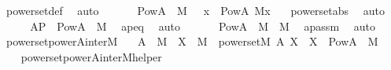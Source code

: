 \begin{isabellebody}
\ powerset{\isacharunderscore}{\kern0pt}def\ \isamarkupfalse%
\ auto\ \isanewline
\ \ \isamarkupfalse%
\ \isamarkupfalse%
\ {\isachardoublequoteopen}Pow{\isacharparenleft}{\kern0pt}A{\isacharparenright}{\kern0pt}\ {\isasyminter}\ M\ {\isacharequal}{\kern0pt}\ {\isacharbraceleft}{\kern0pt}\ x\ {\isasymin}\ Pow{\isacharparenleft}{\kern0pt}A{\isacharparenright}{\kern0pt}{\isachardot}{\kern0pt}\ {\isacharparenleft}{\kern0pt}{\isacharhash}{\kern0pt}{\isacharhash}{\kern0pt}M{\isacharparenright}{\kern0pt}{\isacharparenleft}{\kern0pt}x{\isacharparenright}{\kern0pt}\ {\isacharbraceright}{\kern0pt}{\isachardoublequoteclose}\ \isamarkupfalse%
\ powerset{\isacharunderscore}{\kern0pt}abs\ \isamarkupfalse%
\ auto\ \isanewline
\ \ \isamarkupfalse%
\ \isamarkupfalse%
\ {\isachardoublequoteopen}AP\ {\isacharequal}{\kern0pt}\ Pow{\isacharparenleft}{\kern0pt}A{\isacharparenright}{\kern0pt}\ {\isasyminter}\ M{\isachardoublequoteclose}\ \isamarkupfalse%
\ apeq\ \isamarkupfalse%
\ auto\ \isanewline
\ \ \isamarkupfalse%
\ \isamarkupfalse%
\ {\isachardoublequoteopen}{\isacharparenleft}{\kern0pt}Pow{\isacharparenleft}{\kern0pt}A{\isacharparenright}{\kern0pt}\ {\isasyminter}\ M{\isacharparenright}{\kern0pt}\ {\isasymin}\ M{\isachardoublequoteclose}\ \isamarkupfalse%
\ apassm\ \isamarkupfalse%
\ auto\ \isanewline
{}\isamarkupfalse%
%
\endisatagproof
{\isafoldproof}%
%
\isadelimproof
\isanewline
%
\endisadelimproof
\isanewline
{}\isamarkupfalse%
\ powerset{\isacharunderscore}{\kern0pt}powerA{\isacharunderscore}{\kern0pt}inter{\isacharunderscore}{\kern0pt}M\isanewline
\ \ {\isacharcolon}{\kern0pt}\ {\isachardoublequoteopen}A\ {\isasymin}\ M\ {\isasymLongrightarrow}\ X\ {\isasymin}\ M\ {\isasymLongrightarrow}\ powerset{\isacharparenleft}{\kern0pt}{\isacharhash}{\kern0pt}{\isacharhash}{\kern0pt}M{\isacharcomma}{\kern0pt}\ A{\isacharcomma}{\kern0pt}\ X{\isacharparenright}{\kern0pt}\ {\isasymLongrightarrow}\ X\ {\isacharequal}{\kern0pt}\ {\isacharparenleft}{\kern0pt}Pow{\isacharparenleft}{\kern0pt}A{\isacharparenright}{\kern0pt}\ {\isasyminter}\ M{\isacharparenright}{\kern0pt}{\isachardoublequoteclose}\ \isanewline
%
\isadelimproof
\ \ %
\endisadelimproof
%
\isatagproof
{}\isamarkupfalse%
\ powerset{\isacharunderscore}{\kern0pt}powerA{\isacharunderscore}{\kern0pt}inter{\isacharunderscore}{\kern0pt}M{\isacharunderscore}{\kern0pt}helper\ \isamarkupfalse%

\end{isabellebody}
